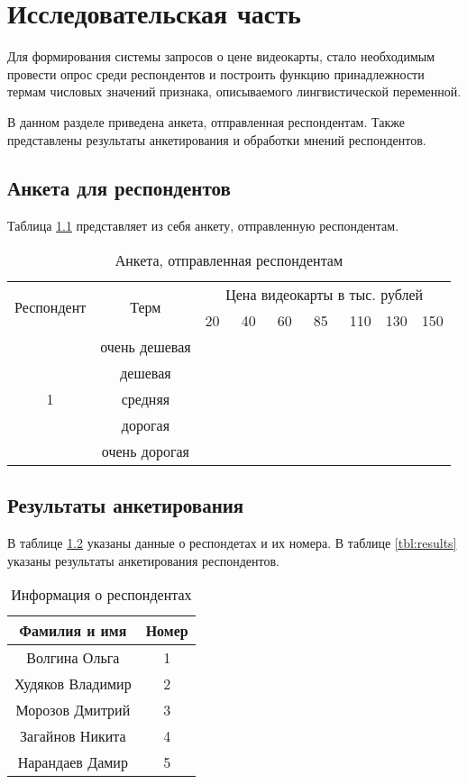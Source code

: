 \chapter{Исследовательская часть}


Для формирования системы запросов о цене видеокарты, стало необходимым провести опрос среди респондентов и построить функцию принадлежности термам числовых значений признака, описываемого лингвистической переменной.

В данном разделе приведена анкета, отправленная респондентам.
Также представлены результаты анкетирования и обработки мнений респондентов.

\section{Анкета для респондентов}


Таблица \ref{tbl:form} представляет из себя анкету, отправленную респондентам.

\begin{table}[H]
	\centering
	\caption{Анкета, отправленная респондентам}
	\label{tbl:form}
	\begin{tabular}{|c|c|c|c|c|c|c|c|c|}
		\hline
	 	\multirow{2}{*}{Респондент} & \multirow{2}{*}{Терм} & \multicolumn{7}{c|}{Цена видеокарты в тыс. рублей} \\
	 	\cline{3-9} && 20~ & 40~ & 60~ & 85~ & 110 & 130 & 150 \\
	  	\hline
	  	\multirow{5}{*}{1} & очень дешевая &&&&&&&  \\
	  	\cline{2-9} & дешевая &&&&&&&  \\
	  	\cline{2-9} & средняя &&&&&&&  \\
	  	\cline{2-9} & дорогая &&&&&&&  \\
	  	\cline{2-9} & очень дорогая &&&&&&&  \\
	  	\hline
	\end{tabular}
\end{table}

\section{Результаты анкетирования}

В таблице \ref{tbl:resps} указаны данные о респондетах и их номера.
В таблице \ref{tbl:results} указаны результаты анкетирования респондентов.

\begin{table}[H]
	\centering
	\caption{Информация о респондентах}
	\label{tbl:resps}
	\begin{tabular}{|c|c|}
	  \hline
	  Фамилия и имя & Номер \\
	  \hline
	  Волгина Ольга & 1 \\
	  \hline
	  Худяков Владимир & 2 \\
	  \hline
	  Морозов Дмитрий & 3 \\
	  \hline
	  Загайнов Никита & 4 \\
	  \hline
	  Нарандаев Дамир & 5 \\
	  \hline
	\end{tabular}
\end{table}

